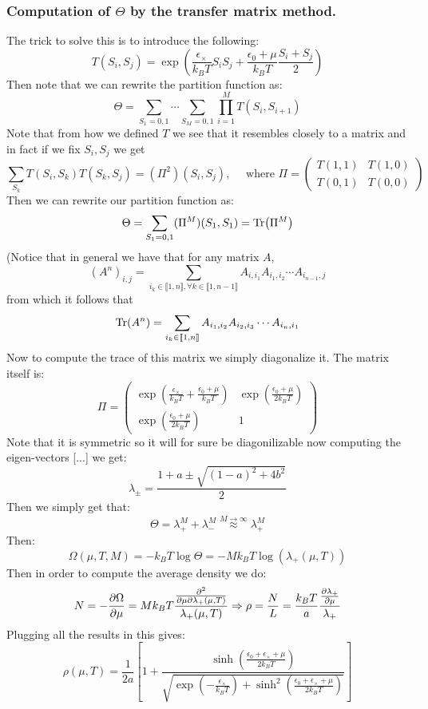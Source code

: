 \documentclass[10pt,a4paper]{book}
\begin{document}
\subsubsection{Computation of $\Theta$ by the transfer matrix method.}
The trick to solve this is to introduce the following:
\[
T(S_i, S_j) = \exp(\frac{\epsilon_\times}{k_B T} S_i S_j + \frac{\epsilon_0 + \mu}{k_B T} \frac{S_i + S_j}{2})
\]
Then note that we can rewrite the partition function as:
\[
\Theta = \sum_{S_1 = 0, 1}\cdots\sum_{S_M = 0, 1} \prod_{i = 1}^M T(S_i,S_{i+1})
\]
Note that from how we defined $T$ we see that it resembles closely to a matrix and in fact if we fix $S_i,S_j$ we get
\[
\sum_{S_k} T(S_i, S_k) T(S_k ,S_j) = (\Pi^2) (S_i, S_j), \quad \text{ where } \Pi = \begin{pmatrix}
T(1, 1) & T(1, 0)\\
T(0, 1) & T(0, 0)
\end{pmatrix}
\]
Then we can rewrite our partition function as:
\[
\Theta = \sum_{S_1 = 0,1} (\Pi^M ) (S_1, S_1) = \Tr (\Pi^M)
\]
(Notice that in general we have that for any matrix $A$,
$$(A^n)_{i,j}=\sum_{i_k\in\llbracket 1,n\rrbracket,\forall k\in\llbracket 1,n-1\rrbracket}A_{i,i_1}A_{i_1,i_2}\cdots A_{i_{n-1},j}$$ from which it follows that 
$$
\Tr(A^n)=
\sum_{i_k\in\llbracket 1,n\rrbracket}A_{i_1,i_2}A_{i_2,i_3}\cdots A_{i_n,i_1}
$$
Now to compute the trace of this matrix we simply diagonalize it. The matrix itself is:
\[
\Pi = \begin{pmatrix}
\exp(\frac{\epsilon_\times}{k_B T} + \frac{\epsilon_0 + \mu}{k_B T}) & \exp(\frac{\epsilon_0 + \mu}{2 k_B T})\\
\exp(\frac{\epsilon_0 + \mu}{2 k_B T}) & 1
\end{pmatrix}
\]
Note that it is symmetric so it will for sure be diagonilizable now computing the eigen-vectors [...] we get:
\[
\lambda_{\pm} = \frac{1 + a \pm \sqrt{(1 - a)^2 + 4b^2}}{2}
\]
Then we simply get that:
\[
\Theta = \lambda_+^M + \lambda_-^M \stackrel{M \to \infty}{\approx} \lambda_+^M
\]
Then:
\[
\Omega(\mu, T, M) = - k_B T \log \Theta = - M k_B T \log(\lambda_+(\mu, T))
\]
Then in order to compute the average density we do:
\[
N = - \pdv{\Omega}{\mu} = M k_B T \frac{\pdv{}{\mu} {\lambda_+ (\mu, T)}}{\lambda_+(\mu, T)} \Rightarrow \rho = \frac{N}{L} = \frac{k_B T}{a} \frac{\pdv{\lambda_+}{\mu}}{\lambda_+}
\]
Plugging all the results in this gives:
\[
\rho(\mu, T) = \frac{1}{2 a} \left[ 1 + \frac{\sinh(\frac{\epsilon_0 + \epsilon_\times + \mu}{2 k_B T})}{\sqrt{\exp({-\frac{\epsilon_\times}{k_B T}}) + \sinh^2(\frac{\epsilon_0 + \epsilon_\times + \mu}{2 k_B T})}} \right]
\]
\end{document}
